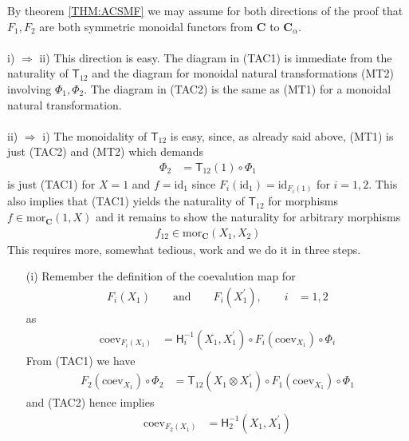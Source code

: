 \begin{prf}
By theorem \ref{THM:ACSMF} we may assume for both directions of the proof that $F_{1},F_{2}$ are both symmetric monoidal functors from $\mathbf{C}$ to $\mathbf{C}_{\alpha}$.
\\\\
i) $\Rightarrow$ ii)
\qquad
This direction is easy. The diagram in (TAC1) is immediate from the naturality of $\mathsf{T}_{12}$ and the diagram for monoidal natural transformations (MT2) involving $\Phi_{1},\Phi_{2}$. The diagram in (TAC2) is the same as (MT1) for a monoidal natural transformation.
\\\\
ii) $\Rightarrow$ i)
\qquad
The monoidality of $\mathsf{T}_{12}$ is easy, since, as already said above, (MT1) is just (TAC2) and (MT2) which demands
\begin{align*}
  \Phi_{2}
  &=
  \mathsf{T}_{12}(1)
  \circ
  \Phi_{1}
\end{align*}
is just (TAC1) for $X = 1$ and $f = \mathrm{id}_{1}$ since $F_{i}(\mathrm{id}_{1}) = \mathrm{id}_{F_{i}(1)}$ for $i = 1,2$. This also implies that (TAC1) yields the naturality of $\mathsf{T}_{12}$ for morphisms $f \in \mathrm{mor}_{\mathbf{C}}(1,X)$ and it remains to show the naturality for arbitrary morphisms
\begin{align*}
  f_{12}
  \in
  \mathrm{mor}_{\mathbf{C}}(X_{1},X_{2})
\end{align*}
This requires more, somewhat tedious, work and we do it in three steps.
\begin{enumerate}
\item[(i)]
Remember the definition of the coevalution map for
\begin{align*}
  F_{i}(X_{1})
  \qquad
  \text{and}
  \qquad
  F_{i}(X_{1}^{\prime})
  ,\qquad
  i
  &=
  1
  ,
  2
\end{align*}
as
\begin{align*}
  \mathrm{coev}_{F_{i}(X_{1})}
  &=
  \mathsf{H}_{i}^{-1}(X_{1},X_{1}^{\prime})
  \circ
  F_{i}(\mathrm{coev}_{X_{1}})
  \circ
  \Phi_{i}
\end{align*}
From (TAC1) we have
\begin{align*}
  F_{2}(\mathrm{coev}_{X_{1}})
  \circ
  \Phi_{2}
  &=
  \mathsf{T}_{12}(X_{1} \otimes X_{1}^{\prime})
  \circ
  F_{1}(\mathrm{coev}_{X_{1}})
  \circ
  \Phi_{1}
\end{align*}
and (TAC2) hence implies
\begin{align*}
  \mathrm{coev}_{F_{2}(X_{1})}
  &=
  \mathsf{H}_{2}^{-1}(X_{1},X_{1}^{\prime})

\end{align*}
\end{enumerate}
\end{prf}
